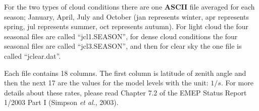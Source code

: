For the two types of cloud conditions there are one {\bf ASCII} file 
averaged for each season; January, April, July and October (jan represents
winter, apr represents spring, jul represents summer, oct represents
autumn). For light
cloud the four seasonal files are called ``jcl1.SEASON'', for dense cloud conditions
the four seasonal files are called ``jcl3.SEASON'', and then for clear sky the one file 
is called ``jclear.dat''.

Each file contains 18 columns. The first column is latitude of zenith 
angle and then the
next 17 are the values for the model levels with the unit: $1/s$. 
For more details about these rates, please read Chapter 7.2 of the EMEP
Status Report 1/2003 Part I (Simpson {\sl et al.}, 2003).

